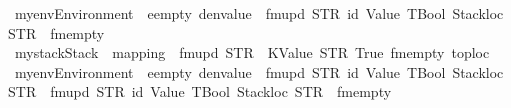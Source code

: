 \begin{isabellebody}
\isadelimdocument
%
\endisadelimdocument
%
\isatagdocument
%
\isamarkuptrue%
%
\endisatagdocument
{\isafolddocument}%
%
\isadelimdocument
%
\endisadelimdocument
{}\isamarkupfalse%
\ {\isachardoublequoteopen}myenv{\isacharcolon}{\kern0pt}{\isacharcolon}{\kern0pt}Environment\ {\isasymequiv}\ eempty\ {\isasymlparr}denvalue\ {\isacharcolon}{\kern0pt}{\isacharequal}{\kern0pt}\ fmupd\ STR\ {\isacharprime}{\kern0pt}{\isacharprime}{\kern0pt}id{}{\isacharprime}{\kern0pt}{\isacharprime}{\kern0pt}\ {\isacharparenleft}{\kern0pt}Value\ TBool{\isacharcomma}{\kern0pt}\ Stackloc\ STR\ {\isacharprime}{\kern0pt}{\isacharprime}{\kern0pt}{}{\isacharprime}{\kern0pt}{\isacharprime}{\kern0pt}{\isacharparenright}{\kern0pt}\ fmempty{\isasymrparr}{\isachardoublequoteclose}\isanewline
{}\isamarkupfalse%
\ {\isachardoublequoteopen}mystack{\isacharcolon}{\kern0pt}{\isacharcolon}{\kern0pt}Stack\ {\isasymequiv}\ {\isasymlparr}mapping\ {\isacharequal}{\kern0pt}\ fmupd\ {\isacharparenleft}{\kern0pt}STR\ {\isacharprime}{\kern0pt}{\isacharprime}{\kern0pt}{}{\isacharprime}{\kern0pt}{\isacharprime}{\kern0pt}{\isacharparenright}{\kern0pt}\ {\isacharparenleft}{\kern0pt}KValue\ STR\ {\isacharprime}{\kern0pt}{\isacharprime}{\kern0pt}True{\isacharprime}{\kern0pt}{\isacharprime}{\kern0pt}{\isacharparenright}{\kern0pt}\ fmempty{\isacharcomma}{\kern0pt}\ toploc\ {\isacharequal}{\kern0pt}\ {}{\isasymrparr}{\isachardoublequoteclose}\isanewline
\isanewline
{}\isamarkupfalse%
\ {\isachardoublequoteopen}myenv{}{\isacharcolon}{\kern0pt}{\isacharcolon}{\kern0pt}Environment\ {\isasymequiv}\ eempty\ {\isasymlparr}denvalue\ {\isacharcolon}{\kern0pt}{\isacharequal}{\kern0pt}\ fmupd\ STR\ {\isacharprime}{\kern0pt}{\isacharprime}{\kern0pt}id{}{\isacharprime}{\kern0pt}{\isacharprime}{\kern0pt}\ {\isacharparenleft}{\kern0pt}Value\ TBool{\isacharcomma}{\kern0pt}\ Stackloc\ STR\ {\isacharprime}{\kern0pt}{\isacharprime}{\kern0pt}{}{\isacharprime}{\kern0pt}{\isacharprime}{\kern0pt}{\isacharparenright}{\kern0pt}\ {\isacharparenleft}{\kern0pt}fmupd\ STR\ {\isacharprime}{\kern0pt}{\isacharprime}{\kern0pt}id{}{\isacharprime}{\kern0pt}{\isacharprime}{\kern0pt}\ {\isacharparenleft}{\kern0pt}Value\ TBool{\isacharcomma}{\kern0pt}\ Stackloc\ STR\ {\isacharprime}{\kern0pt}{\isacharprime}{\kern0pt}{}{\isacharprime}{\kern0pt}{\isacharprime}{\kern0pt}{\isacharparenright}{\kern0pt}\ fmempty{\isacharparenright}{\kern0pt}{\isasymrparr}{\isachardoublequoteclose}\isanewline

\end{isabellebody}
